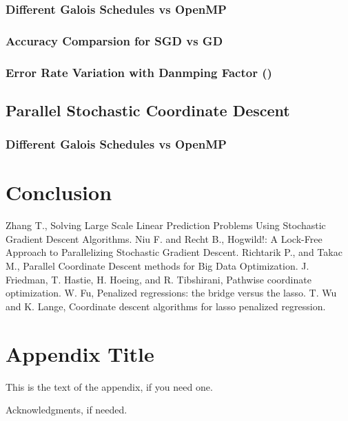 \documentclass{sigplanconf}
\begin{document}
\subsubsection{Different Galois Schedules vs OpenMP}
\subsubsection{Accuracy Comparsion for SGD vs GD}
\subsubsection{Error Rate Variation with Danmping Factor (\neta)}
\subsection{Parallel Stochastic Coordinate Descent}
\subsubsection{Different Galois Schedules vs OpenMP}

\section{Conclusion}



\begin{thebibliography}{}
\softraggedright

Zhang T., Solving Large Scale Linear Prediction Problems Using Stochastic Gradient Descent Algorithms.
Niu F. and Recht B., Hogwild!: A Lock-Free Approach to Parallelizing Stochastic Gradient Descent.
Richtarik P., and Takac M., Parallel Coordinate Descent methods for Big Data Optimization.
J. Friedman, T. Hastie, H. Hoeing, and R. Tibshirani, Pathwise coordinate optimization.
W. Fu, Penalized regressions: the bridge versus the lasso.
T. Wu and K. Lange, Coordinate descent algorithms for lasso penalized regression.

\end{thebibliography}

\appendix

\section{Appendix Title}

This is the text of the appendix, if you need one.

\acks

Acknowledgments, if needed.
\end{document}
